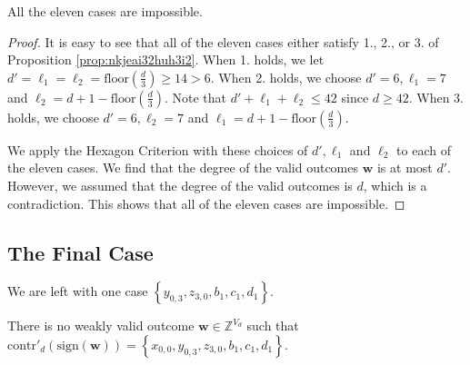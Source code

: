 \begin{proposition}
    All the eleven cases are impossible.
\end{proposition}

\begin{proof}
    It is easy to see that all of the eleven cases either satisfy 1., 2., or 3. of Proposition \ref{prop:nkjeai32huh3i2}. When 1. holds, we let \( d' = \ell_1 = \ell_2 = \mathrm{floor}(\frac{d}{3}) \geq 14 > 6 \). When 2. holds, we choose \( d' = 6, \ell_1 = 7 \) and \( \ell_2 = d + 1 - \mathrm{floor}(\frac{d}{3}) \). Note that \( d' + \ell_1 + \ell_2 \leq 42 \) since \( d \geq 42 \). When 3. holds, we choose  \( d' = 6, \ell_2 = 7 \) and \( \ell_1 = d + 1 - \mathrm{floor}(\frac{d}{3}) \). 

    We apply the Hexagon Criterion with these choices of \( d', \ell_1 \) and \( \ell_2 \) to each of the eleven cases. We find that the degree of the valid outcomes \( \mathbf{w} \) is at most \( d' \). However, we assumed that the degree of the valid outcomes is \( d \), which is a contradiction. This shows that all of the eleven cases are impossible.
\end{proof}


\subsection*{The Final Case}

We are left with one case  \(  \left\{ y_{0,3}, z_{3,0}, b_1, c_1, d_1 \right\}\).

\begin{proposition}
    There is no weakly valid outcome \( \mathbf{w} \in \mathbb{Z}^{V_d} \) such that \( \mathrm{contr}'_d(\mathrm{sign}(\mathbf{w})) =  \left\{ x_{0,0}, y_{0,3}, z_{3,0}, b_1, c_1, d_1 \right\} \).
\end{proposition}

